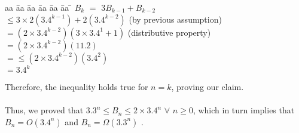 \documentclass{article}
\begin{document}
\begin{problem}
\begin{solution}
\begin{tabbing}
aa \= aa \= aa \= aa \= aa \= aa \= \kill
$B_k$ \> \>$=$ $3B_{k-1} + B_{k-2}$ \\
\> \> $\le 3 \times 2(3.4^{k-1}) + 2(3.4^{k-2})$ (by previous assumption) \\
\> \> $= (2 \times 3.4^{k-2})(3 \times 3.4^1 +1)$ (distributive property) \\
\> \>  $= (2 \times 3.4^{k-2})(11.2)$ \\
\> \> $= \le (2 \times 3.4^{k-2})(3.4^2)$ \\
\> \> $= 3.4^k$
\end{tabbing}
Therefore, the inequality holds true for $n=k $, proving our claim. \\
\\ Thus, we proved that $3.3^n \le B_n \le 2 \times 3.4^n$ $\forall$ $n \ge 0$, which in turn implies that $B_n = O(3.4^n)$ and $B_n = \Omega(3.3^n)$ .

\end{solution}

\end{problem}
\end{document}
